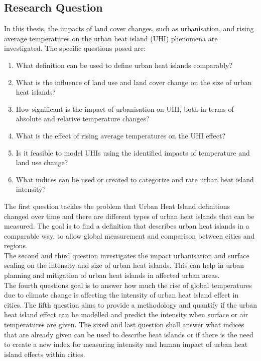 \documentclass[12pt,a4paper, english,twoside]{article}
\begin{document}
 \subsection{Research Question}
  In this thesis, the impacts of land cover changes, such as urbanisation, and rising average temperatures on the urban heat island (UHI) phenomena are investigated.
  The specific questions posed are:
  \begin{enumerate}
    \item What definition can be used to define urban heat islands comparably?
    \item What is the influence of land use and land cover change on the size of urban heat islands?
    \item How significant is the impact of urbanisation on UHI, both in terms of absolute and relative temperature changes?
    \item What is the effect of rising average temperatures on the UHI effect?
    \item Is it feasible to model UHIs using the identified impacts of temperature and land use change?
    \item What indices can be used or created to categorize and rate urban heat island intensity?
  \end{enumerate}
  The first question tackles the problem that Urban Heat Island definitions changed over time and there are different types of urban heat islands that can be measured. The goal is to find a definition that describes urban heat islands in a comparable way, to allow global measurement and comparison between cities and regions.\\ 
  The second and third question investigates the impact urbanisation and surface sealing on the intensity and size of urban heat islands. This can help in urban planning and mitigation of urban heat islands in affected urban areas.\\ %
  The fourth questions goal is to answer how much the rise of global temperatures due to climate change is affecting the intensity of urban heat island effect in cities. 
  The fifth question aims to provide a methodology and quantify if the urban heat island effect can be modelled and predict the intensity when surface or air temperatures are given. 
  The sixed and last question shall answer what indices that are already given can be used to describe heat islands or if there is the need to create a new index for measuring intensity and human impact of urban heat island effects within cities.
\end{document}

